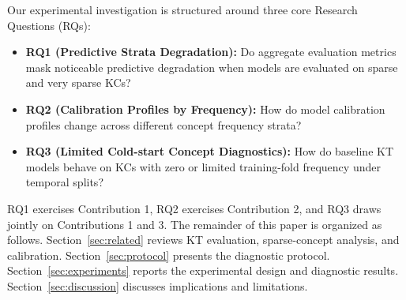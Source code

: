 Our experimental investigation is structured around three core Research Questions (RQs):
\begin{itemize}
    \item \textbf{RQ1 (Predictive Strata Degradation):} Do aggregate evaluation metrics mask noticeable predictive degradation when models are evaluated on sparse and very sparse KCs?
    \item \textbf{RQ2 (Calibration Profiles by Frequency):} How do model calibration profiles change across different concept frequency strata?
    \item \textbf{RQ3 (Limited Cold-start Concept Diagnostics):} How do baseline KT models behave on KCs with zero or limited training-fold frequency under temporal splits?
\end{itemize}

RQ1 exercises Contribution 1, RQ2 exercises Contribution 2, and RQ3 draws jointly on Contributions 1 and 3. The remainder of this paper is organized as follows. Section~\ref{sec:related} reviews KT evaluation, sparse-concept analysis, and calibration. Section~\ref{sec:protocol} presents the diagnostic protocol. Section~\ref{sec:experiments} reports the experimental design and diagnostic results. Section~\ref{sec:discussion} discusses implications and limitations.
